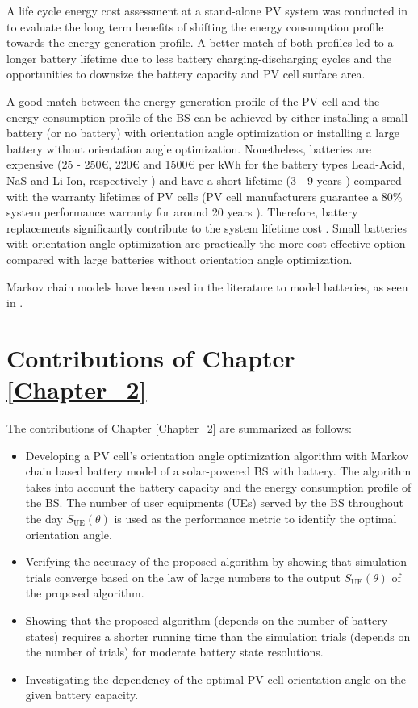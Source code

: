 A life cycle energy cost assessment at a stand-alone PV system was conducted in \cite{Thiaux2010602} to evaluate the long term benefits of shifting the energy consumption profile towards the energy generation profile. A better match of both profiles led to a longer battery lifetime due to less battery charging-discharging cycles and the opportunities to downsize the battery capacity and PV cell surface area. 



A good match between the energy generation profile of the PV cell and the energy consumption profile of the BS can be achieved by either installing a small battery (or no battery) with orientation angle optimization or installing a large battery without orientation angle optimization. Nonetheless, batteries are expensive (25 - 250\euro, 220\euro{} and 1500\euro{} per kWh for the battery types Lead-Acid, NaS and Li-Ion, respectively \cite{RUDOLF2013139}) and have a short lifetime (3 - 9 years \cite{CROSSLAND201530}) compared with the warranty lifetimes of PV cells (PV cell manufacturers guarantee a 80\% system performance warranty for around 20 years \cite{6745088}). Therefore, battery replacements significantly contribute to the system lifetime cost \cite{CROSSLAND201530}. Small batteries with orientation angle optimization are practically the more cost-effective option compared with large batteries without orientation angle optimization.


Markov chain models have been used in the literature to model batteries, as seen in \cite{ParzyszFanny2017PCAf, SakrAhmedHamdi2015AoKU,TingwuWang2016ASiS}.


\section{Contributions of Chapter \ref{Chapter_2}}
The contributions of Chapter \ref{Chapter_2} are summarized as follows:

\begin {itemize}

\item Developing a PV cell's orientation angle optimization algorithm with Markov chain based battery model of a solar-powered BS with battery. The algorithm takes into account the battery capacity and the energy consumption profile of the BS. The number of user equipments (UEs) served by the BS throughout the day $\overline{S_{\mathrm{UE}}}(\theta)$ is used as the performance metric to identify the optimal orientation angle.
\item Verifying the accuracy of the proposed algorithm by showing that simulation trials converge based on the law of large numbers to 
the output $\overline{S_{\mathrm{UE}}}(\theta)$ of the proposed algorithm. 
\item Showing that the proposed algorithm (depends on the number of battery states) requires a shorter running time than the simulation trials (depends on the number of trials) for moderate battery state resolutions.
\item Investigating the dependency of the optimal PV cell orientation angle on the given battery capacity.
\end {itemize}

